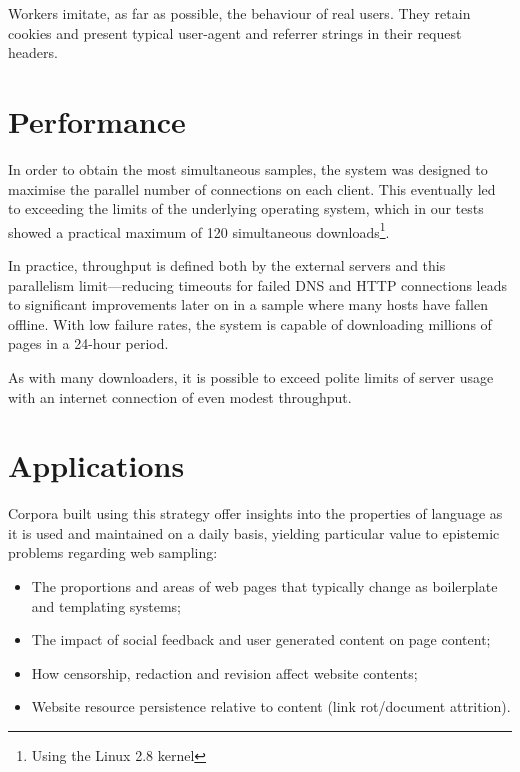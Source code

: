\documentclass[11pt]{article}
\begin{document}
Workers imitate, as far as possible, the behaviour of real users.  They retain cookies and present typical user-agent and referrer strings in their request headers.

\section{Performance}
In order to obtain the most simultaneous samples, the system was designed to maximise the parallel number of connections on each client.  This eventually led to exceeding the limits of the underlying operating system, which in our tests showed a practical maximum of 120 simultaneous downloads\footnote{Using the Linux 2.8 kernel}.

In practice, throughput is defined both by the external servers and this parallelism limit---reducing timeouts for failed DNS and HTTP connections leads to significant improvements later on in a sample where many hosts have fallen offline.  With low failure rates, the system is capable of downloading millions of pages in a 24-hour period.

As with many downloaders, it is possible to exceed polite limits of server usage with an internet connection of even modest throughput.

\section{Applications}

Corpora built using this strategy offer insights into the properties of language as it is used and maintained on a daily basis, yielding particular value to epistemic problems regarding web sampling:

\begin{itemize}
    \item The proportions and areas of web pages that typically change as boilerplate and templating systems;
    \item The impact of social feedback and user generated content on page content;
    \item How censorship, redaction and revision affect website contents;
    \item Website resource persistence relative to content (link rot/document attrition).
\end{itemize}





\end{document}
